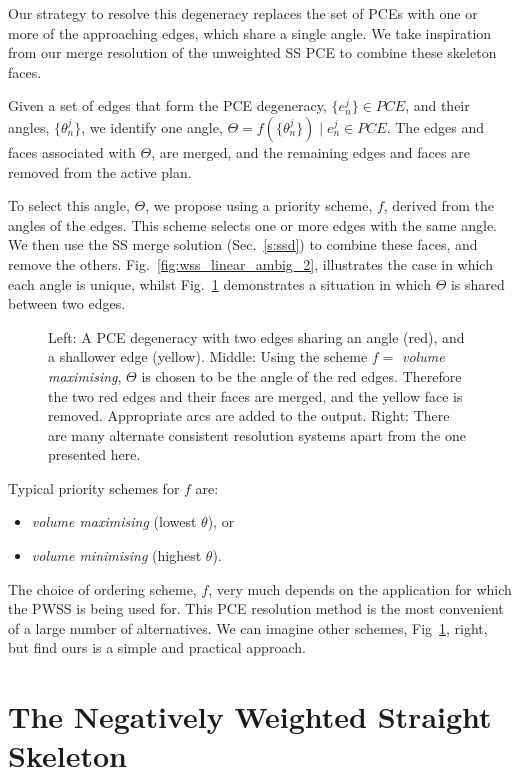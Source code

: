 Our strategy to resolve this degeneracy replaces the set of PCEs with one or more of the approaching edges, which share a single angle. We take inspiration from our merge resolution of the unweighted SS PCE to combine these skeleton faces.

Given a set of edges that form the PCE degeneracy, $\{e^j_n\} \in PCE$, and their angles, $\{\theta^j_n\}$, we identify one angle, $\Theta = f(\{\theta^j_n\}) \mid  e^j_n \in PCE$. The edges and faces associated with $\Theta$, are merged, and the remaining edges and faces are removed from the active plan.

To select this angle, $\Theta$, we propose using a priority scheme, $f$, derived from the angles of the edges. This scheme selects one or more edges with the same angle. We then use the SS merge solution (Sec.~\ref{s:ssd}) to combine these faces, and remove the others. Fig.~\ref{fig:wss_linear_ambig_2}, illustrates the case in which each angle is unique, whilst Fig.~\ref{fig:wss_linear_ambig_3} demonstrates a situation in which $\Theta$ is shared between two edges.

\begin{figure}
  \centering
  \def\svgwidth{1.0\columnwidth}
  
  \caption[A PWSS PCE]{\label{fig:wss_linear_ambig_3} Left: A PCE degeneracy with two edges sharing an angle (red), and a shallower edge (yellow). Middle: Using the scheme $f =$ \emph{volume maximising}, $\Theta$ is chosen to be the angle of the red edges. Therefore the two red edges and their faces are merged, and the yellow face is removed. Appropriate arcs are added to the output. Right: There are many alternate consistent resolution systems apart from the one presented here.}
\end{figure}

Typical priority schemes for $f$ are:
\begin{itemize}
\item{\emph{volume maximising} (lowest $\theta$), or}
\item{\emph{volume minimising} (highest $\theta$). }
\end{itemize}
The choice of ordering scheme, $f$, very much depends on the application for which the PWSS is being used for. This PCE resolution method is the most convenient of a large number of alternatives. We can imagine other schemes, Fig~\ref{fig:wss_linear_ambig_3}, right, but find ours is a simple and practical approach. 


\FloatBarrier
\section{The Negatively Weighted Straight Skeleton}

